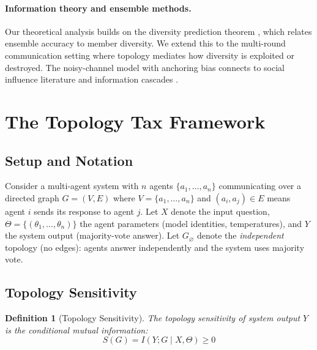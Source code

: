 \documentclass{article}
\newtheorem{definition}{Definition}
\begin{document}
\paragraph{Information theory and ensemble methods.}
Our theoretical analysis builds on the diversity prediction theorem \citep{krogh1995neural,page2007difference}, which relates ensemble accuracy to member diversity. We extend this to the multi-round communication setting where topology mediates how diversity is exploited or destroyed. The noisy-channel model with anchoring bias connects to social influence literature \citep{degroot1974reaching} and information cascades \citep{bikhchandani1992theory}.

\section{The Topology Tax Framework}
\label{sec:framework}

\subsection{Setup and Notation}

Consider a multi-agent system with $n$ agents $\{a_1, \ldots, a_n\}$ communicating over a directed graph $G = (V, E)$ where $V = \{a_1, \ldots, a_n\}$ and $(a_i, a_j) \in E$ means agent $i$ sends its response to agent $j$. Let $X$ denote the input question, $\Theta = \{(\theta_1, \ldots, \theta_n)\}$ the agent parameters (model identities, temperatures), and $Y$ the system output (majority-vote answer). Let $G_\varnothing$ denote the \emph{independent} topology (no edges): agents answer independently and the system uses majority vote.

\subsection{Topology Sensitivity}

\begin{definition}[Topology Sensitivity]
\label{def:sensitivity}
The topology sensitivity of system output $Y$ is the conditional mutual information:
\begin{equation}
    S(G) = I(Y; G \mid X, \Theta) \geq 0
\end{equation}
\end{definition}
\end{document}
